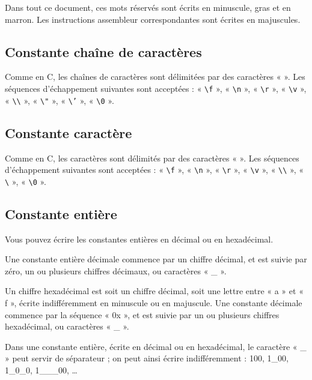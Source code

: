 Dans tout ce document, ces mots réservés sont écrits en minuscule, gras et en marron. Les instructions assembleur correspondantes sont écrites en majuscules.


\subsection{Constante chaîne de caractères}

Comme en C, les chaînes de caractères sont délimitées par des caractères « \texttt{\textquotedbl} ».  Les séquences d’échappement suivantes sont acceptées : « \texttt{\textbackslash f} », « \texttt{\textbackslash n} », « \texttt{\textbackslash r} », « \texttt{\textbackslash v} », « \texttt{\textbackslash\textbackslash} », « \texttt{\textbackslash"} », « \texttt{\textbackslash'} », « \texttt{\textbackslash 0} ».

\subsection{Constante caractère}

Comme en C, les caractères sont délimités par des caractères « \texttt{\textquotesingle} ».  Les séquences d’échappement suivantes sont acceptées : « \texttt{\textbackslash f} », « \texttt{\textbackslash n} », « \texttt{\textbackslash r} », « \texttt{\textbackslash v} », « \texttt{\textbackslash\textbackslash} », « \texttt{\textbackslash\textquotesingle} », « \texttt{\textbackslash 0} ».

\subsection{Constante entière}

Vous pouvez écrire les constantes entières en décimal ou en hexadécimal. 

Une constante entière décimale commence par un chiffre décimal, et est suivie par zéro, un ou plusieurs chiffres décimaux, ou caractères « \_ ».

Un chiffre hexadécimal est soit un chiffre décimal, soit une lettre entre « a » et « f », écrite indifféremment en minuscule ou en majuscule. Une constante décimale commence par la séquence « 0x », et est suivie par un ou plusieurs chiffres hexadécimal, ou caractères « \_ ».

Dans une constante entière, écrite en décimal ou en hexadécimal, le caractère « \_ » peut servir de séparateur ; on peut ainsi écrire indifféremment : 100, 1\_00, 1\_0\_0, 1\_\_\_00, …

